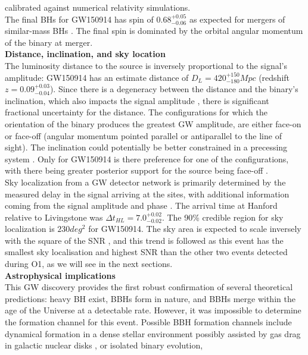 \documentclass[binding=0.6cm, LaM]{sapthesis}
\begin{document}
	calibrated against numerical relativity simulations. \\
	The final BHs for GW150914 has spin of $0.68^{+0.05}_{-0.06}$ as expected for mergers of similar-mass BHs \cite{99, 100}. 
	The final spin is dominated by the orbital angular momentum of the binary at merger. \\
	\textbf{Distance, inclination, and sky location} \\
	The luminosity distance to the source is inversely proportional to the signal’s amplitude: 
	GW150914 has an estimate distance of $D_L = 420^{+150}_{-180}Mpc$ (redshift $z=0.09^{+0.03}_{-0.04}$). 
	Since there is a degeneracy between the distance and the binary’s inclination, 	
	which also impacts the signal amplitude \cite{96-98}, 
	there is significant fractional uncertainty for the distance. 
	The configurations for which the orientation of the binary produces the greatest GW amplitude, 
	are either face-on or face-off (angular momentum pointed parallel or antiparallel to the line of sight). 
	The inclination could potentially be better constrained in a precessing system \cite{94, 95}. 
	Only for GW150914 is there preference for one of the configurations, with there being greater posterior support for the source being face-off \cite{93}. \\ 
	Sky localization from a GW detector network is primarily determined by the measured delay in the signal arriving at the sites, 
	with additional information coming from the signal amplitude and phase \cite{91,92}. 
	The arrival time at Hanford relative to Livingstone was $\Delta t_{HL} = 7.0^{+0.02}_{-0.02}$.
	The 90\% credible region for sky localization is $230 deg^2$ for GW150914.
	The sky area is expected to scale inversely with the square of the SNR \cite{89,90}, 
	and this trend is followed as this event has the smallest sky localisation and 
	highest SNR than the other two events detected during O1, as we will see in the next sections. \\
	\textbf{Astrophysical implications} \\
	This GW discovery provides the first robust confirmation of several theoretical predictions:
	heavy BH exist, BBHs form in nature, and BBHs merge within the age of the Universe at a detectable rate. 
	However, it was impossible to determine the formation channel for this event. 
	Possible BBH formation channels include dynamical formation in a dense stellar environment \cite{84, 88} 
	possibly assisted by gas drag in galactic nuclear disks \cite{82, 83}, or isolated binary evolution, 
\end{document}

